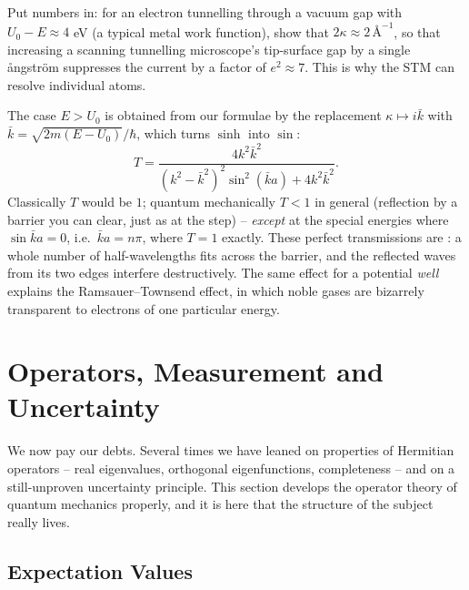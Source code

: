 \begin{exercise}
    Put numbers in: for an electron tunnelling through a vacuum gap with $U_0 - E \approx 4$ eV (a typical metal work function), show that $2\kappa \approx 2 \, \text{\AA}^{-1}$, so that increasing a scanning tunnelling microscope's tip-surface gap by a single \aa ngstr\"om suppresses the current by a factor of $e^2 \approx 7$. This is why the STM can resolve individual atoms.
\end{exercise}

\begin{remark}
    The case $E > U_0$ is obtained from our formulae by the replacement $\kappa \mapsto i \bar{k}$ with $\bar{k} = \sqrt{2m(E - U_0)}/\hbar$, which turns $\sinh$ into $\sin$:
    $$
    T = \frac{4 k^2 \bar{k}^2}{(k^2 - \bar{k}^2)^2 \sin^2(\bar{k} a) + 4 k^2 \bar{k}^2}.
    $$
    Classically $T$ would be $1$; quantum mechanically $T < 1$ in general (reflection by a barrier you can clear, just as at the step) -- \emph{except} at the special energies where $\sin \bar{k} a = 0$, i.e.\ $\bar{k} a = n \pi$, where $T = 1$ exactly. These perfect transmissions are : a whole number of half-wavelengths fits across the barrier, and the reflected waves from its two edges interfere destructively. The same effect for a potential \emph{well} explains the Ramsauer--Townsend effect, in which noble gases are bizarrely transparent to electrons of one particular energy.
\end{remark}

\section{Operators, Measurement and Uncertainty}

We now pay our debts. Several times we have leaned on properties of Hermitian operators -- real eigenvalues, orthogonal eigenfunctions, completeness -- and on a still-unproven uncertainty principle. This section develops the operator theory of quantum mechanics properly, and it is here that the structure of the subject really lives.

\subsection{Expectation Values}

